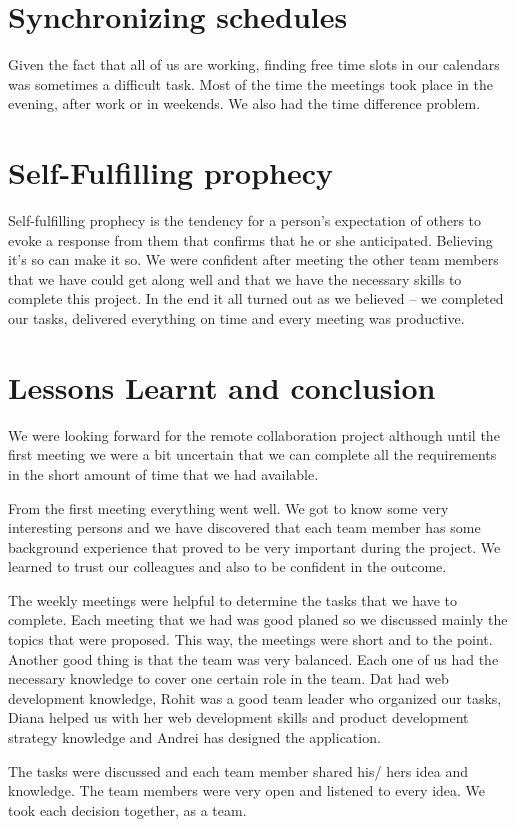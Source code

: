 \section{Synchronizing schedules}
Given the fact that all of us are working, finding free time slots in our calendars was sometimes a difficult task. Most of the time the meetings took place in the evening, after work or in weekends. We also had the time difference problem.

\section{Self-Fulfilling prophecy}
Self-fulfilling prophecy is the tendency for a person’s expectation of others to evoke a response from them that confirms that he or she anticipated. Believing it’s so can make it so. We were confident after meeting the other team members that we have could get along well and that we have the necessary skills to complete this project. In the end it all turned out as we believed – we completed our tasks, delivered everything on time and every meeting was productive.

\section{Lessons Learnt and conclusion}
We were looking forward for the remote collaboration project although until the first meeting we were a bit uncertain that we can complete all the requirements in the short amount of time that we had available.

From the first meeting everything went well. We got to know some very interesting persons and we have discovered that each team member has some background experience that proved to be very important during the project. We learned to trust our colleagues and also to be confident in the outcome.


The weekly meetings were helpful to determine the tasks that we have to complete. Each meeting that we had was good planed so we discussed mainly the topics that were proposed. This way, the meetings were short and to the point.
Another good thing is that the team was very balanced. Each one of us had the necessary knowledge to cover one certain role in the team. Dat had web development knowledge, Rohit was a good team leader who organized our tasks, Diana helped us with her web development skills and product development strategy knowledge and Andrei has designed the application.

The tasks were discussed and each team member shared his/ hers idea and knowledge. The team members were very open and listened to every idea. We took each decision together, as a team.
